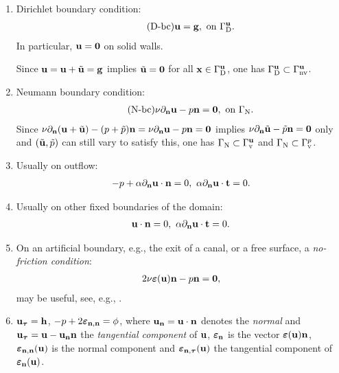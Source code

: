 \documentclass[oneside,11pt]{book}
\numberwithin{equation}{section}
\begin{document}
\begin{enumerate}
    \item Dirichlet boundary condition:
    \begin{align}
        \label{Dirichlet BC}
        \tag{D-bc}
        {\bf u} = {\bf g},\mbox{ on }\Gamma_{\rm D}^{\bf u}.
    \end{align}
    In particular, ${\bf u } = {\bf 0}$ on solid walls.
    
    Since ${\bf u} = {\bf u} + \tilde{\bf u} = {\bf g}$ implies $\tilde{\bf u} = {\bf 0}$ for all ${\bf x}\in\Gamma_{\rm D}^{\bf u}$, one has $\Gamma_{\rm D}^{\bf u}\subset\Gamma_{\rm nv}^{\bf u}$.
    \item Neumann boundary condition:
    \begin{align}
        \label{Neumann BC}
        \tag{N-bc}
        \nu\partial_{\bf n}{\bf u} - p{\bf n} = {\bf 0},\mbox{ on }\Gamma_{\rm N}.
    \end{align}
    Since $\nu\partial_{\bf n}({\bf u} + \tilde{\bf u}) - (p + \tilde{p}){\bf n} = \nu\partial_{\bf n}{\bf u} - p{\bf n} = {\bf 0}$ implies $\nu\partial_{\bf n}\tilde{\bf u} - \tilde{p}{\bf n} = {\bf 0}$ only and $(\tilde{\bf u},\tilde{p})$ can still vary to satisfy this, one has $\Gamma_{\rm N}\subset\Gamma_{\rm v}^{\bf u}$ and $\Gamma_{\rm N}\subset\Gamma_{\rm v}^p$.
    \item Usually on outflow:
    \begin{align*}
        -p + \alpha\partial_{\bf n}{\bf u}\cdot{\bf n} = 0,\ \alpha\partial_{\bf n}{\bf u}\cdot{\bf t} = 0.
    \end{align*}
    \item Usually on other fixed boundaries of the domain:
    \begin{align*}
        {\bf u}\cdot{\bf n} = 0,\ \alpha\partial_{\bf n}{\bf u}\cdot{\bf t} = 0.
    \end{align*}
    \item On an artificial boundary, e.g., the exit of a canal, or a free surface, a \textit{no-friction condition}:
    \begin{align*}
        2\nu\boldsymbol{\varepsilon}({\bf u}){\bf n} - p{\bf n} = {\bf 0},
    \end{align*}
    may be useful, see, e.g., \cite{Mazya_Rossmann2005, Mazya_Rossmann2007, Mazya_Rossmann2009}.
    \item ${\bf u}_{\boldsymbol{\tau}} = {\bf h}$, $-p + 2\boldsymbol{\varepsilon}_{{\bf n},{\bf n}} = \phi$, where ${\bf u}_{\bf n} = {\bf u}\cdot{\bf n}$ denotes the \textit{normal} and ${\bf u}_{\boldsymbol{\tau}} = {\bf u} - {\bf u}_{\bf n}{\bf n}$ the \textit{tangential component} of ${\bf u}$, $\boldsymbol{\varepsilon}_{\bf n}$ is the vector $\boldsymbol{\varepsilon}({\bf u}){\bf n}$, $\boldsymbol{\varepsilon}_{{\bf n},{\bf n}}({\bf u})$ is the normal component and $\boldsymbol{\varepsilon}_{{\bf n},\boldsymbol{\tau}}({\bf u})$ the tangential component of $\boldsymbol{\varepsilon}_{\bf n}({\bf u})$.

\end{enumerate}
\end{document}
